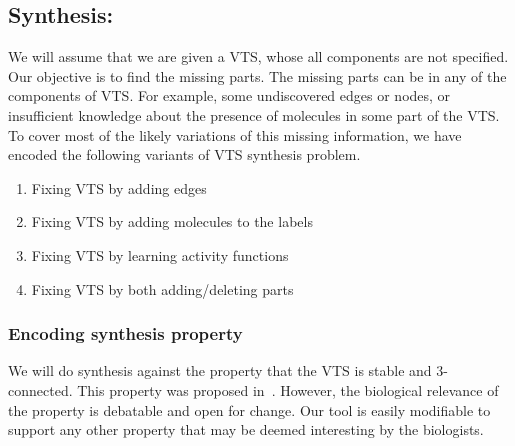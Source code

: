 %

\subsection{Synthesis:}
We will assume that we are given a VTS, whose all components
are not specified.
%
Our objective is to find the missing parts.
%
The missing parts can be in any of the components of VTS. 
%
For example, some undiscovered edges or nodes, or insufficient
knowledge about the presence of molecules in some part of the VTS.
%
To cover most of the likely variations of this missing information,
we have encoded the following variants of VTS synthesis problem.

\begin{enumerate}
	\item Fixing VTS by adding edges 
	\item Fixing VTS by adding molecules to the labels
	\item Fixing VTS by learning activity functions
	\item  Fixing VTS by both adding/deleting parts
\end{enumerate}

\subsubsection{Encoding synthesis property}

We will do synthesis against the property that the VTS
is stable and 3-connected.
%
%
This property was proposed in~\cite{shukla2017discovering}.
%
However, the biological relevance of the property is debatable and open for change.
%
Our tool is easily modifiable to support any other property that may be deemed 
interesting by the biologists.


             
